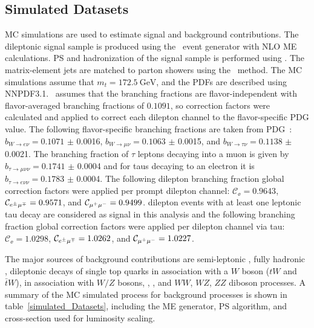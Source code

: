 \subsection{Simulated Datasets}
MC simulations are used to estimate signal and background contributions. 
The dileptonic \ttbar signal sample is produced using the \Powheg\ event generator with NLO ME calculations. 
PS and hadronization of the \ttbar signal sample is performed using \Pythia. 
The matrix-element jets are matched to parton showers using the \Powheg\ method. 
The MC simulations assume that $m_t = \SI{172.5}{\GeV}$, and the PDFs are described using NNPDF3.1.
\Powheg\ assumes that the \ttbar branching fractions are flavor-independent with flavor-averaged branching fractions of $0.1091$, so correction factors were calculated and applied to correct each dilepton channel to the flavor-specific PDG value.
The following flavor-specific branching fractions are taken from PDG~\cite{bib:PDG}: $b_{{\ensuremath{W\to e\nu}}} = 0.1071$ $\pm$ 0.0016, $b_{{\ensuremath{W\to \mu\nu}}} = 0.1063$ $\pm$ 0.0015, and $b_{{\ensuremath{W\to \tau\nu}}} = 0.1138$ $\pm$ 0.0021.
The branching fraction of $\tau$ leptons decaying into a muon is given by $b_{{\ensuremath{\tau\to \mu\nu\nu}}} = 0.1741$ $\pm$ 0.0004 and for taus decaying to an electron it is $b_{{\ensuremath{\tau\to e\nu\nu}}} = 0.1783$ $\pm$ 0.0004.
The following \ttbar dilepton branching fraction global correction factors were applied per prompt dilepton channel: $\mathcal{C}_{\ee} = 0.9643$, $\mathcal{C}_{e^{\pm}\mu^{\mp}} = 0.9571$, and $\mathcal{C}_{\mu^{+}\mu^{-}} = 0.9499$.  
\ttbar dilepton events with at least one leptonic tau decay are considered as signal in this analysis and the following branching fraction global correction factors were applied per dilepton channel via tau: $\mathcal{C}_{\ee} = 1.0298$, $\mathcal{C}_{e^{\pm}\mu^{\mp}} = 1.0262$, and $\mathcal{C}_{\mu^{+}\mu^{-}} = 1.0227$.

The major sources of background contributions are semi-leptonic \ttbar, fully hadronic \ttbar, dileptonic decays of single top quarks in association with a $W$ boson ($tW$ and $\bar{t}W$), \ttbar in association with $W/Z$ bosons, \zjets, \wjets, and $WW$, $WZ$, $ZZ$ diboson processes. 
A summary of the MC simulated process for background processes is shown in table~\ref{simulated_Datasets}, including the ME generator, PS algorithm, and cross-section used for luminosity scaling.

